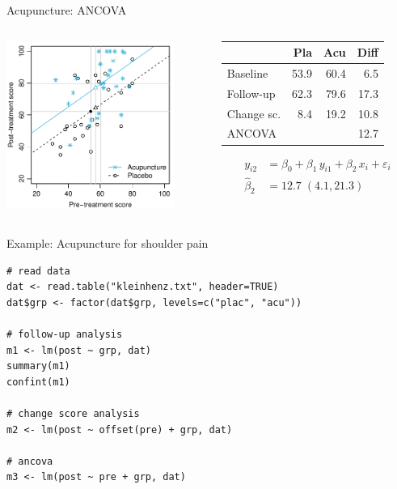\documentclass[aspectratio=169]{beamer}
\begin{document}
\begin{frame}{Acupuncture: ANCOVA}
\begin{columns}[T]
\begin{column}{5.5cm}
  \includegraphics[width=5.5cm]{../figures/acu-anco}
\end{column}
%
\begin{column}{5.5cm}
  \vspace*{1em}\small
  \begin{tabular}{lrrr}
  \hline
             &  Pla &  Acu & Diff \\ \hline
  Baseline   & 53.9 & 60.4 &  6.5 \\
  Follow-up  & 62.3 & 79.6 & 17.3 \\
  Change sc. &  8.4 & 19.2 & 10.8 \\
  ANCOVA     &      &      & 12.7 \\ \hline
  \end{tabular}
\begin{align*}
         y_{i2} &= \beta_0 + \beta_1 \, y_{i1} + \beta_2 \, x_i +
                    \varepsilon_i \\
  \hat{\beta}_2 &= 12.7 \; (4.1, 21.3)
\end{align*}
\end{column}
\end{columns}
\end{frame}

\begin{frame}[fragile]{Example: Acupuncture for shoulder pain}
\begin{lstlisting}
# read data
dat <- read.table("kleinhenz.txt", header=TRUE)
dat$grp <- factor(dat$grp, levels=c("plac", "acu"))

# follow-up analysis
m1 <- lm(post ~ grp, dat)
summary(m1)
confint(m1)

# change score analysis
m2 <- lm(post ~ offset(pre) + grp, dat)

# ancova
m3 <- lm(post ~ pre + grp, dat)
\end{lstlisting}
\end{frame}
\end{document}
